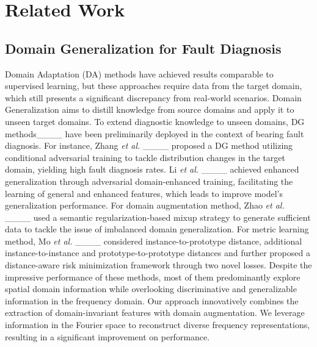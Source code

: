 \section{Related Work}
\subsection{Domain Generalization for Fault Diagnosis}
Domain Adaptation (DA) methods have achieved results comparable to supervised learning, but these approaches require data from the target domain, which still presents a significant discrepancy from real-world scenarios. Domain Generalization aims to distill knowledge from source domains and apply it to unseen target domains. To extend diagnostic knowledge to unseen domains, DG methods____ have been preliminarily deployed in the context of bearing fault diagnosis. For instance, Zhang \textit{et al.} ____ proposed a DG method utilizing conditional adversarial training to tackle distribution changes in the target domain, yielding high fault diagnosis rates. Li \textit{et al.} ____ achieved enhanced generalization through adversarial domain-enhanced training, facilitating the learning of general and enhanced features, which leads to improve model's generalization performance. For domain augmentation method, Zhao \textit{et al.} ____ used a semantic regularization-based mixup strategy to generate sufficient data to tackle the issue of imbalanced domain generalization. For metric learning method, Mo \textit{et al.} ____ considered instance-to-prototype distance, additional instance-to-instance and prototype-to-prototype distances and further proposed a distance-aware risk minimization framework through two novel losses. Despite the impressive performance of these methods, most of them predominantly explore spatial domain information while overlooking discriminative and generalizable information in the frequency domain. Our approach innovatively combines the extraction of domain-invariant features with domain augmentation. We leverage information in the Fourier space to reconstruct diverse frequency representations, resulting in a significant improvement on performance.


